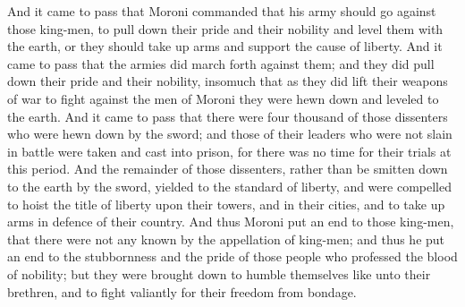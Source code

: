 And it came to pass that Moroni commanded that his army should go against those king-men, to pull down their pride and their nobility and level them with the earth, or they should take up arms and support the cause of liberty.
\bverse \iffalse And it came to pass that the armies did march forth against them; and they did pull down their pride and their nobility, insomuch that as they did lift their weapons of war to fight against the men of Moroni they were hewn down and leveled to the earth. \fi
And it came to pass that the armies did march forth against them; and they did pull down their pride and their nobility, insomuch that as they did lift their weapons of war to fight against the men of Moroni they were hewn down and leveled to the earth.
\bverse \iffalse And it came to pass that there were four thousand of those dissenters who were hewn down by the sword; and those of their leaders who were not slain in battle were taken and cast into prison, for there was no time for their trials at this period. \fi
And it came to pass that there were four thousand of those dissenters who were hewn down by the sword; and those of their leaders who were not slain in battle were taken and cast into prison, for there was no time for their trials at this period.
\bverse \iffalse And the remainder of those dissenters, rather than be smitten down to the earth by the sword, yielded to the standard of liberty, and were compelled to hoist the title of liberty upon their towers, and in their cities, and to take up arms in defence of their country. \fi
And the remainder of those dissenters, rather than be smitten down to the earth by the sword, yielded to the standard of liberty, and were compelled to hoist the title of liberty upon their towers, and in their cities, and to take up arms in defence of their country.
\bverse \iffalse And thus Moroni put an end to those king-men, that there were not any known by the appellation of king-men; and thus he put an end to the stubbornness and the pride of those people who professed the blood of nobility; but they were brought down to humble themselves like unto their brethren, and to fight valiantly for their freedom from bondage. \fi
And thus Moroni put an end to those king-men, that there were not any known by the appellation of king-men; and thus he put an end to the stubbornness and the pride of those people who professed the blood of nobility; but they were brought down to humble themselves like unto their brethren, and to fight valiantly for their freedom from bondage.
